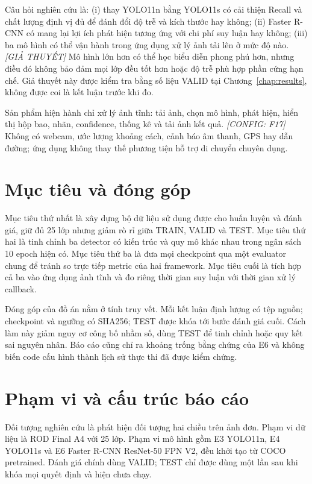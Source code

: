 \documentclass[12pt,a4paper,oneside]{report}
\newcommand{\configured}[1]{\textit{[CONFIG: #1]}}
\newcommand{\hypothesis}{\textit{[GIẢ THUYẾT]}}
\begin{document}
Câu hỏi nghiên cứu là: (i) thay YOLO11n bằng YOLO11s có cải thiện Recall và chất lượng định vị đủ để đánh đổi độ trễ và kích thước hay không; (ii) Faster R-CNN có mang lại lợi ích phát hiện tương ứng với chi phí suy luận hay không; (iii) ba mô hình có thể vận hành trong ứng dụng xử lý ảnh tải lên ở mức độ nào. \hypothesis\; Mô hình lớn hơn có thể học biểu diễn phong phú hơn, nhưng điều đó không bảo đảm mọi lớp đều tốt hơn hoặc độ trễ phù hợp phần cứng hạn chế. Giả thuyết này được kiểm tra bằng số liệu VALID tại Chương~\ref{chap:results}, không được coi là kết luận trước khi đo.

Sản phẩm hiện hành chỉ xử lý ảnh tĩnh: tải ảnh, chọn mô hình, phát hiện, hiển thị hộp bao, nhãn, confidence, thống kê và tải ảnh kết quả. \configured{F17} Không có webcam, ước lượng khoảng cách, cảnh báo âm thanh, GPS hay dẫn đường; ứng dụng không thay thế phương tiện hỗ trợ di chuyển chuyên dụng.

\section{Mục tiêu và đóng góp}
Mục tiêu thứ nhất là xây dựng bộ dữ liệu sử dụng được cho huấn luyện và đánh giá, giữ đủ 25 lớp nhưng giảm rò rỉ giữa TRAIN, VALID và TEST. Mục tiêu thứ hai là tinh chỉnh ba detector có kiến trúc và quy mô khác nhau trong ngân sách 10 epoch hiện có. Mục tiêu thứ ba là đưa mọi checkpoint qua một evaluator chung để tránh so trực tiếp metric của hai framework. Mục tiêu cuối là tích hợp cả ba vào ứng dụng ảnh tĩnh và đo riêng thời gian suy luận với thời gian xử lý callback.

Đóng góp của đồ án nằm ở tính truy vết. Mỗi kết luận định lượng có tệp nguồn; checkpoint và ngưỡng có SHA256; TEST được khóa tới bước đánh giá cuối. Cách làm này giảm nguy cơ công bố nhầm số, dùng TEST để tinh chỉnh hoặc quy kết sai nguyên nhân. Báo cáo cũng chỉ ra khoảng trống bằng chứng của E6 và không biến code cấu hình thành lịch sử thực thi đã được kiểm chứng.

\section{Phạm vi và cấu trúc báo cáo}
Đối tượng nghiên cứu là phát hiện đối tượng hai chiều trên ảnh đơn. Phạm vi dữ liệu là ROD Final A4 với 25 lớp. Phạm vi mô hình gồm E3 YOLO11n, E4 YOLO11s và E6 Faster R-CNN ResNet-50 FPN V2, đều khởi tạo từ COCO pretrained. Đánh giá chính dùng VALID; TEST chỉ được dùng một lần sau khi khóa mọi quyết định và hiện chưa chạy.
\end{document}
